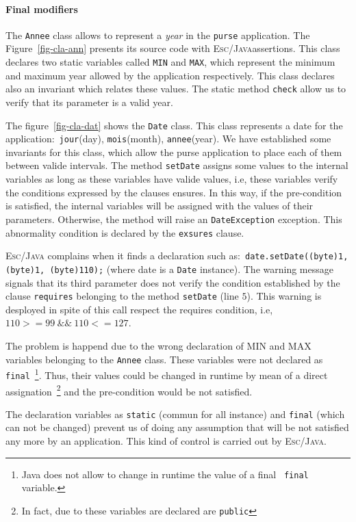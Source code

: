 \documentclass[a4paper]{llncs}
\begin{document}
\paragraph{Final modifiers}
The \texttt{Annee} class allows to represent a \textit{year} in the
\texttt{purse} application. The Figure~\ref{fig-cla-ann} presents its
source code with \textsc{Esc/Java}assertions. This class declares two 
static variables called \texttt{MIN} and \texttt{MAX}, which represent
the minimum and maximum year allowed by the application
respectively. This class declares
also an invariant which relates these values. The static method
\texttt{check} allow us to verify that its parameter is a valid
year. 

The figure~\ref{fig-cla-dat} shows the \texttt{Date} class. This class
represents a date for the application$:$ \texttt{jour}(day),
\texttt{mois}(month), \texttt{annee}(year). We have established some
invariants for this class, which allow the purse application to place
each of them between valide intervals. The method \texttt{setDate}
assigns some values to the internal variables as long as
these variables have valide values, i.e, these variables verify the
conditions expressed by the clauses ensures. In this way, if the
pre-condition is satisfied, the internal variables will be assigned
with the values of their parameters. Otherwise, the method will raise
an \texttt{DateException} exception. This abnormality condition is
declared by the \texttt{exsures} clause. 

\textsc{Esc/Java} complains when it finds a declaration such as$:$ 
\mbox{\tt date.setDate((byte)1, (byte)1, (byte)110);} (where date is a
\texttt{Date} instance). The warning message signals that its third
parameter does not verify the condition established by the clause
\texttt{requires} belonging to the method \texttt{setDate} (line
$5$). This warning is desployed in spite of this call respect the
requires condition, i.e, $110>=99\ \&\&\ 110<= 127$. 

The problem is happend due to the wrong declaration of \textsc{MIN}
and \textsc{MAX} variables belonging to the \texttt{Annee}
class. These variables were not declared as \texttt{final}~\footnote{{\sc
Java} does not allow to change in runtime the value of a final {\tt
final} variable.}. Thus, their values could be changed in runtime by
mean of a direct assignation~\footnote{In fact, due to these variables
are declared are \texttt{public}} and the pre-condition would be not
satisfied. 


The declaration variables as \texttt{static} (commun for all instance)
and \texttt{final} (which can not be changed) prevent us of doing
any assumption that will be not satisfied any more by an
application. This kind of control is carried out by
\textsc{Esc/Java}. 
\end{document}
